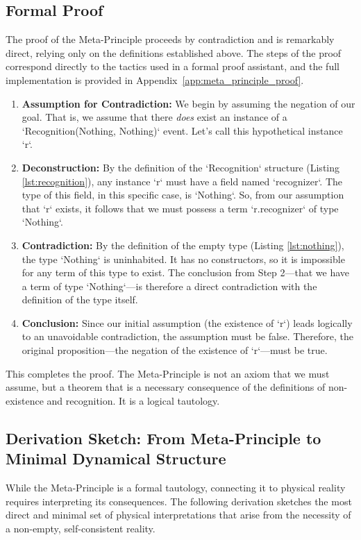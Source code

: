 \documentclass[axioms,article,submit,pdftex,oneauthor]{Definitions/mdpi}
\begin{document}
\subsection{Formal Proof}
The proof of the Meta-Principle proceeds by contradiction and is remarkably direct, relying only on the definitions established above. The steps of the proof correspond directly to the tactics used in a formal proof assistant, and the full implementation is provided in Appendix~\ref{app:meta_principle_proof}.

\begin{enumerate}
    \item \textbf{Assumption for Contradiction:} We begin by assuming the negation of our goal. That is, we assume that there \textit{does} exist an instance of a `Recognition(Nothing, Nothing)` event. Let's call this hypothetical instance `r`.
    
    \item \textbf{Deconstruction:} By the definition of the `Recognition` structure (Listing \ref{lst:recognition}), any instance `r` must have a field named `recognizer`. The type of this field, in this specific case, is `Nothing`. So, from our assumption that `r` exists, it follows that we must possess a term `r.recognizer` of type `Nothing`.
    
    \item \textbf{Contradiction:} By the definition of the empty type (Listing \ref{lst:nothing}), the type `Nothing` is uninhabited. It has no constructors, so it is impossible for any term of this type to exist. The conclusion from Step 2—that we have a term of type `Nothing`—is therefore a direct contradiction with the definition of the type itself.
    
    \item \textbf{Conclusion:} Since our initial assumption (the existence of `r`) leads logically to an unavoidable contradiction, the assumption must be false. Therefore, the original proposition—the negation of the existence of `r`—must be true. 
\end{enumerate}

This completes the proof. The Meta-Principle is not an axiom that we must assume, but a theorem that is a necessary consequence of the definitions of non-existence and recognition. It is a logical tautology.

\subsection{Derivation Sketch: From Meta-Principle to Minimal Dynamical Structure}
While the Meta-Principle is a formal tautology, connecting it to physical reality requires interpreting its consequences. The following derivation sketches the most direct and minimal set of physical interpretations that arise from the necessity of a non-empty, self-consistent reality.
\end{document}
